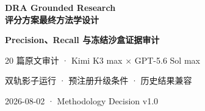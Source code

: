 \documentclass[UTF8,a4paper,10.5pt]{ctexart}
\begin{document}
\begin{titlepage}
  \centering
  \vspace*{2.6cm}
  {\Huge\bfseries\color{DraBlue}DRA Grounded Research\\评分方案最终方法学设计\par}
  \vspace{0.9cm}
  {\LARGE\bfseries Precision、Recall 与冻结沙盒证据审计\par}
  \vspace{0.45cm}
  {\Large 20 篇原文审计 · Kimi K3 max × GPT-5.6 Sol max\par}
  \vspace{1.35cm}
  {\large 双轨影子运行 · 预注册升级条件 · 历史结果兼容\par}
  \vfill
  {\large 2026-08-02 · Methodology Decision v1.0\par}
  \vspace{0.8cm}
\end{titlepage}
\tableofcontents
\clearpage
{}
\end{document}
